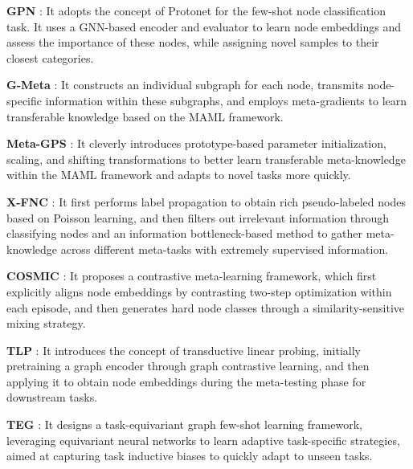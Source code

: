 \noindent \textbf{GPN} \cite{ding2020graph}: It adopts the concept of Protonet for the few-shot node classification task. It uses a GNN-based encoder and evaluator to learn node embeddings and assess the importance of these nodes, while assigning novel samples to their closest categories.

\noindent \textbf{G-Meta} \cite{huang2020graph}: It constructs an individual subgraph for each node, transmits node-specific information within these subgraphs, and employs meta-gradients to learn transferable knowledge based on the MAML framework.

\noindent \textbf{Meta-GPS} \cite{liu2022few}: It cleverly introduces prototype-based parameter initialization, scaling, and shifting transformations to better learn transferable meta-knowledge within the MAML framework and adapts to novel tasks more quickly.


\noindent \textbf{X-FNC} \cite{wang2023few}: It first performs label propagation to obtain rich pseudo-labeled nodes based on Poisson learning, and then filters out irrelevant information through classifying nodes and an information bottleneck-based method to gather meta-knowledge across different meta-tasks with extremely supervised information.

\noindent \textbf{COSMIC} \cite{wang2023contrastive}: It proposes a contrastive meta-learning framework, which first explicitly aligns node embeddings by contrasting two-step optimization within each episode, and then generates hard node classes through a similarity-sensitive mixing strategy.

\noindent \textbf{TLP} \cite{tan2022transductive}: It introduces the concept of transductive linear probing, initially pretraining a graph encoder through graph contrastive learning, and then applying it to obtain node embeddings during the meta-testing phase for downstream tasks. 

\noindent \textbf{TEG} \cite{kim2023task}: It designs a task-equivariant graph few-shot learning framework, leveraging equivariant neural networks to learn adaptive task-specific strategies, aimed at capturing task inductive biases to quickly adapt to unseen tasks.

